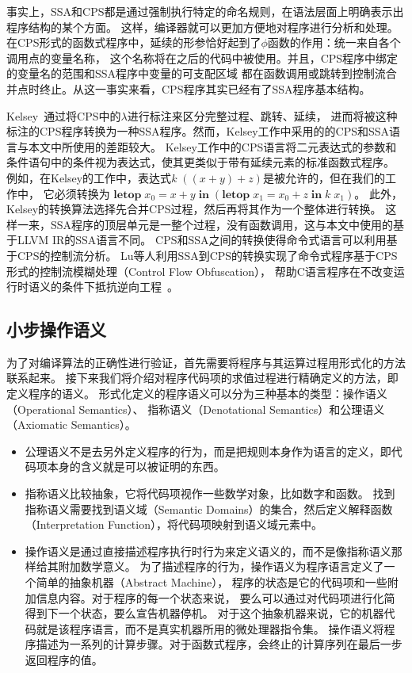 事实上，SSA和CPS都是通过强制执行特定的命名规则，在语法层面上明确表示出程序结构的某个方面。
这样，编译器就可以更加方便地对程序进行分析和处理。
在CPS形式的函数式程序中，延续的形参恰好起到了$\phi$函数的作用：统一来自各个调用点的变量名称，
这个名称将在之后的代码中被使用。并且，CPS程序中绑定的变量名的范围和SSA程序中变量的可支配区域
都在函数调用或跳转到控制流合并点时终止。从这一事实来看，CPS程序其实已经有了SSA程序基本结构。

Kelsey~\cite{kelsey1995correspondence}通过将CPS中的$\lambda$进行标注来区分完整过程、跳转、延续，
进而将被这种标注的CPS程序转换为一种SSA程序。然而，Kelsey工作中采用的的CPS和SSA语言与本文中所使用的差距较大。
Kelsey工作中的CPS语言将二元表达式的参数和条件语句中的条件视为表达式，使其更类似于带有延续元素的标准函数式程序。
例如，在Kelsey的工作中，表达式$k\; ((x+y)+z)$是被允许的，但在我们的工作中，
它必须转换为
$\mathbf{letop}\; x_0 = x+y\; \mathbf{in}\; (\mathbf{letop}\; x_1 = x_0+z\; \mathbf{in}\; k\; x_1)$。
此外，Kelsey的转换算法选择先合并CPS过程，然后再将其作为一个整体进行转换。
这样一来，SSA程序的顶层单元是一整个过程，没有函数调用，这与本文中使用的基于LLVM IR的SSA语言不同。
CPS和SSA之间的转换使得命令式语言可以利用基于CPS的控制流分析。
Lu等人利用SSA到CPS的转换实现了命令式程序基于CPS形式的控制流模糊处理（Control Flow Obfuscation），
帮助C语言程序在不改变运行时语义的条件下抵抗逆向工程~\cite{10.1145/3294032.3294083}。

\subsection{小步操作语义} \label{sec:smallop}

为了对编译算法的正确性进行验证，首先需要将程序与其运算过程用形式化的方法联系起来。
接下来我们将介绍对程序代码项的求值过程进行精确定义的方法，即定义程序的语义。
形式化定义的程序语义可以分为三种基本的类型：操作语义（Operational Semantics）、
指称语义（Denotational Semantics）和公理语义（Axiomatic Semantics）\cite{pierce2002types}。

\begin{itemize}
    \item 公理语义不是去另外定义程序的行为，而是把规则本身作为语言的定义，即代码项本身的含义就是可以被证明的东西。
    \item 指称语义比较抽象，它将代码项视作一些数学对象，比如数字和函数。
    找到指称语义需要找到语义域（Semantic Domains）的集合，然后定义解释函数
    （Interpretation Function），将代码项映射到语义域元素中。
    \item 操作语义是通过直接描述程序执行时行为来定义语义的，而不是像指称语义那样给其附加数学意义。
    为了描述程序的行为，操作语义为程序语言定义了一个简单的抽象机器（Abstract Machine），
    程序的状态是它的代码项和一些附加信息内容。对于程序的每一个状态来说，
    要么可以通过对代码项进行化简得到下一个状态，要么宣告机器停机。
    对于这个抽象机器来说，它的机器代码就是该程序语言，而不是真实机器所用的微处理器指令集。
    操作语义将程序描述为一系列的计算步骤。对于函数式程序，会终止的计算序列在最后一步返回程序的值。
\end{itemize}

